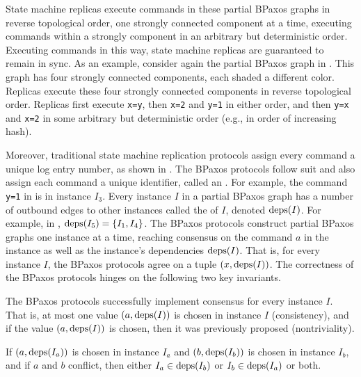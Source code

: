 State machine replicas execute commands in these partial BPaxos graphs in
reverse topological order, one strongly connected component at a time, executing
commands within a strongly component in an arbitrary but deterministic order.
Executing commands in this way, state machine replicas are guaranteed to remain
in sync. As an example, consider again the partial BPaxos graph in
. This graph has four strongly connected components, each
shaded a different color. Replicas execute these four strongly connected
components in reverse topological order. Replicas first execute \texttt{x=y},
then \texttt{x=2} and \texttt{y=1} in either order, and then \texttt{y=x} and
\texttt{x=2} in some arbitrary but deterministic order (e.g., in order of
increasing hash).

Moreover, traditional state machine replication protocols assign every command
a unique log entry number, as shown in . The BPaxos protocols
follow suit and also assign each command a unique identifier, called an
. For example, the command \texttt{y=1} in 
is in instance $I_3$. Every instance $I$ in a partial BPaxos graph has a number
of outbound edges to other instances called the  of $I$,
denoted $\text{deps}(I)$. For example, in , $\text{deps}(I_5) = \{I_1,
I_4\}$.
%
The BPaxos protocols construct partial BPaxos graphs one instance at a time,
reaching consensus on the command $a$ in the instance as well as the instance's
dependencies $\text{deps}(I)$. That is, for every instance $I$, the BPaxos protocols
agree on a tuple $(x, \text{deps}(I))$.
%
The correctness of the BPaxos protocols hinges on the following two key
invariants.

\begin{invariant}
  The BPaxos protocols successfully implement consensus for every instance $I$.
  That is, at most one value $(a, \text{deps}(I))$ is chosen in instance $I$
  (consistency), and if the value $(a, \text{deps}(I))$ is chosen, then it was
  previously proposed (nontriviality).
\end{invariant}%
%
\begin{invariant}
  If $(a, \text{deps}(I_a))$ is chosen in instance $I_a$ and $(b, \text{deps}(I_b))$ is
  chosen in instance $I_b$, and if $a$ and $b$ conflict, then either $I_a \in
  \text{deps}(I_b)$ or $I_b \in \text{deps}(I_a)$ or both.
\end{invariant} 

